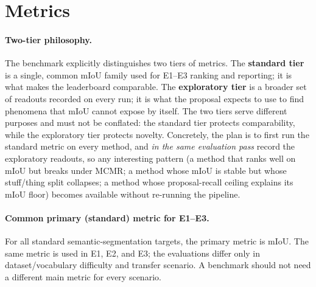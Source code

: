 \documentclass[11pt,a4paper]{article}
\begin{document}
\section{Metrics}
\label{sec:metrics}

\paragraph{Two-tier philosophy.}
The benchmark explicitly distinguishes two tiers of metrics. The \textbf{standard tier} is a single, common mIoU family used for E1--E3 ranking and reporting; it is what makes the leaderboard comparable. The \textbf{exploratory tier} is a broader set of readouts recorded on every run; it is what the proposal expects to use to find phenomena that mIoU cannot expose by itself. The two tiers serve different purposes and must not be conflated: the standard tier protects comparability, while the exploratory tier protects novelty. Concretely, the plan is to first run the standard metric on every method, and \emph{in the same evaluation pass} record the exploratory readouts, so any interesting pattern (a method that ranks well on mIoU but breaks under MCMR; a method whose mIoU is stable but whose stuff/thing split collapses; a method whose proposal-recall ceiling explains its mIoU floor) becomes available without re-running the pipeline.

\paragraph{Common primary (standard) metric for E1--E3.}
For all standard semantic-segmentation targets, the primary metric is mIoU. The same metric is used in E1, E2, and E3; the evaluations differ only in dataset/vocabulary difficulty and transfer scenario. A benchmark should not need a different main metric for every scenario.
\end{document}
